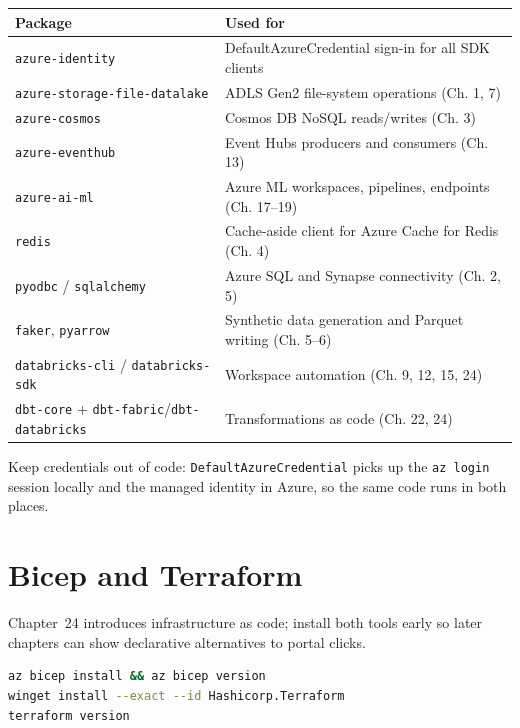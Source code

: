 \begin{center}
\footnotesize
\begin{tabular}{@{}p{4.6cm}p{8.6cm}@{}}
\toprule
\textbf{Package} & \textbf{Used for} \\
\midrule
\texttt{azure-identity} & DefaultAzureCredential sign-in for all SDK clients \\
\texttt{azure-storage-file-datalake} & ADLS Gen2 file-system operations (Ch. 1, 7) \\
\texttt{azure-cosmos} & Cosmos DB NoSQL reads/writes (Ch. 3) \\
\texttt{azure-eventhub} & Event Hubs producers and consumers (Ch. 13) \\
\texttt{azure-ai-ml} & Azure ML workspaces, pipelines, endpoints (Ch. 17--19) \\
\texttt{redis} & Cache-aside client for Azure Cache for Redis (Ch. 4) \\
\texttt{pyodbc} / \texttt{sqlalchemy} & Azure SQL and Synapse connectivity (Ch. 2, 5) \\
\texttt{faker}, \texttt{pyarrow} & Synthetic data generation and Parquet writing (Ch. 5--6) \\
\texttt{databricks-cli} / \texttt{databricks-sdk} & Workspace automation (Ch. 9, 12, 15, 24) \\
\texttt{dbt-core} + \texttt{dbt-fabric}/\texttt{dbt-databricks} & Transformations as code (Ch. 22, 24) \\
\bottomrule
\end{tabular}
\end{center}

Keep credentials out of code: \texttt{DefaultAzureCredential} picks up the \texttt{az login}
session locally and the managed identity in Azure, so the same code runs in both places.

\section{Bicep and Terraform}
%
Chapter~24 introduces infrastructure as code; install both tools early so later chapters can show
declarative alternatives to portal clicks.

\begin{lstlisting}[language=bash,caption={Installing Bicep and Terraform on Windows.},label={lst:appenv-iac}]
az bicep install && az bicep version
winget install --exact --id Hashicorp.Terraform
terraform version
\end{lstlisting}

